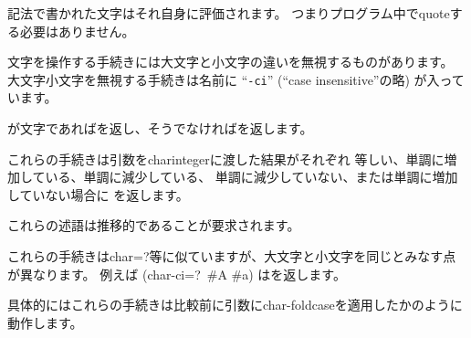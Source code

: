 \sharpsign\backwhack{} 記法で書かれた文字はそれ自身に評価されます。
つまりプログラム中でquoteする必要はありません。

\vest 文字を操作する手続きには大文字と小文字の違いを無視するものがあります。
大文字小文字を無視する手続きは名前に
\hbox{``{\tt -ci}''} (``case insensitive''の略) が入っています。


\begin{entry}{%
}

が文字であれば\schtrue{}を返し、そうでなければ\schfalse{}を返します。

\end{entry}


\begin{entry}{%
}

\label{characterequality}

これらの手続きは引数を{\cf char\coerce{}integer}に渡した結果がそれぞれ
等しい、単調に増加している、単調に減少している、
単調に減少していない、または単調に増加していない場合に
\schtrue{}を返します。

これらの述語は推移的であることが要求されます。

\end{entry}


\begin{entry}{%
}

これらの手続きは{\cf char=?}等に似ていますが、大文字と小文字を同じとみなす点が異なります。
例えば {\cf (char-ci=?\ \#\backwhack{}A \#\backwhack{}a)} は\schtrue{}を返します。

具体的にはこれらの手続きは比較前に引数に{\cf char-foldcase}を適用したかのように動作します。

\end{entry}


